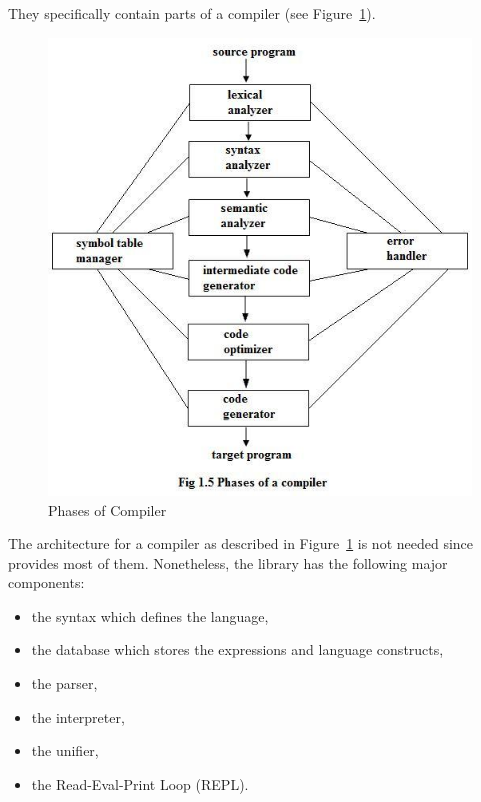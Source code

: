 \documentclass[thesis-solanki.tex]{subfiles}
\begin{document}
They specifically contain parts of a compiler (see Figure~\ref{fig:Phases of Compiler}).

\begin{figure}[H]
\centering
\includegraphics[scale = 0.7]{Phases_of_compiler.jpg}
\caption{Phases of Compiler \cite{Aho:1986:CPT:6448}}
\label{fig:Phases of Compiler}
\end{figure}

The architecture for a compiler as described in Figure~\ref{fig:Phases of Compiler} is not needed since
 provides most of them.
Nonetheless, the library has the following major components:

\begin{itemize}
\item the syntax which defines the language,

\item the database which stores the expressions and language constructs,

\item the parser,

\item the interpreter,

\item the unifier,

\item the Read-Eval-Print Loop (REPL).
\end{itemize}
\end{document}
